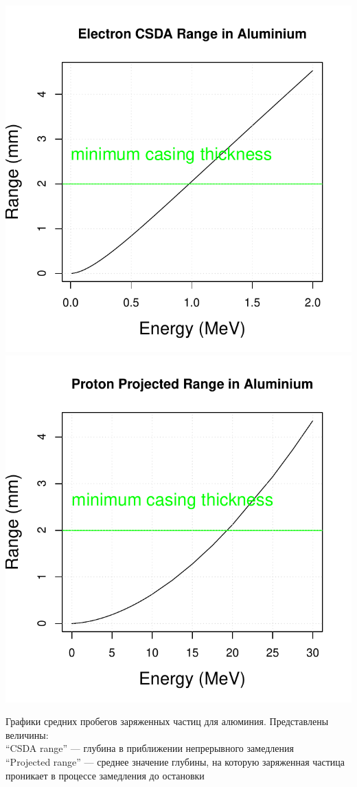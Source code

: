 \documentclass[t, aspectratio=43]{beamer}
\begin{document}
\begin{frame}
\begin{columns}[T]
\begin{column}{.5\textwidth}
\begin{block}{}
\begin{center}
	\includegraphics[width=0.5\linewidth]{images/edata}
	\includegraphics[width=0.5\linewidth]{images/pdata}
\end{center}

	\tiny{Графики средних пробегов заряженных частиц для алюминия. Представлены величины: \\		``CSDA range'' --- глубина в приближении непрерывного замедления \\		``Projected range'' --- среднее значение глубины, на которую заряженная частица проникает в процессе замедления до остановки}

	\end{block}
\end{column}
\end{columns}
\end{frame}
\end{document}
